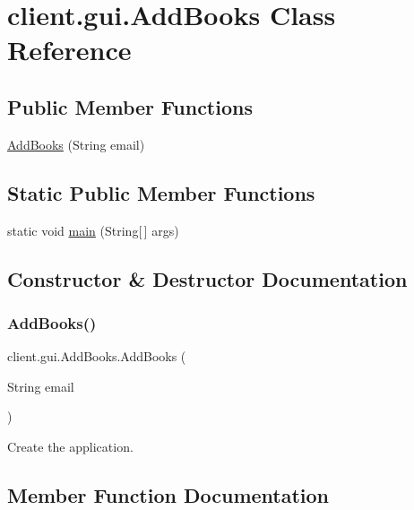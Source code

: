 \hypertarget{classclient_1_1gui_1_1_add_books}{}\section{client.\+gui.\+Add\+Books Class Reference}
\label{classclient_1_1gui_1_1_add_books}
\subsection*{Public Member Functions}
\begin{DoxyCompactItemize}
\item 
\hyperlink{classclient_1_1gui_1_1_add_books_a5f3ccc825d3ccf8c2055b6b0f15b05f8}{Add\+Books} (String email)
\end{DoxyCompactItemize}
\subsection*{Static Public Member Functions}
\begin{DoxyCompactItemize}
\item 
static void \hyperlink{classclient_1_1gui_1_1_add_books_ab90180ce7815a1a6cb95d6ce27788672}{main} (String\mbox{[}$\,$\mbox{]} args)
\end{DoxyCompactItemize}


\subsection{Constructor \& Destructor Documentation}
\mbox{\label{classclient_1_1gui_1_1_add_books_a5f3ccc825d3ccf8c2055b6b0f15b05f8}} 
\subsubsection{\texorpdfstring{Add\+Books()}{AddBooks()}}
{\footnotesize\ttfamily client.\+gui.\+Add\+Books.\+Add\+Books (\begin{DoxyParamCaption}\item[{String}]{email }\end{DoxyParamCaption})}

Create the application. 

\subsection{Member Function Documentation}
\mbox{\label{classclient_1_1gui_1_1_add_books_ab90180ce7815a1a6cb95d6ce27788672}} 
